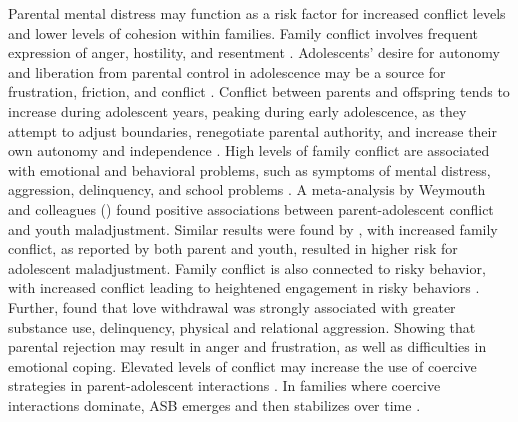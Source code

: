 \documentclass{sn-jnl}                  %
\begin{document}
Parental mental distress may function as a risk factor for increased conflict levels and lower levels of cohesion within families. Family conflict involves frequent expression of anger, hostility, and resentment \citep{lobraico:2020}.  Adolescents' desire for autonomy and liberation from parental control in adolescence may be a source for frustration, friction, and conflict \citep{buehler:2006, saxbe:2014}. Conflict between parents and offspring tends to increase during adolescent years, peaking during early adolescence, as they attempt to adjust boundaries, renegotiate parental authority, and increase their own autonomy and independence \citep{weymouth:2016}. High levels of family conflict are associated with emotional and behavioral problems, such as symptoms of mental distress, aggression, delinquency, and school problems \citep{fosco:2020, sun:2021, xu:2017}. A meta-analysis by Weymouth and colleagues (\citeyear{weymouth:2016}) found positive associations between parent-adolescent conflict and youth maladjustment. Similar results were found by \citet{xu:2017}, with increased family conflict, as reported by both parent and youth, resulted in higher risk for adolescent maladjustment. Family conflict is also connected to risky behavior, with increased conflict leading to heightened engagement in risky behaviors \citep{skinner:2016}. Further, \citet{romm:2022} found that love withdrawal was strongly associated with greater substance use, delinquency, physical and relational aggression. Showing that parental rejection may result in anger and frustration, as well as difficulties in emotional coping. Elevated levels of conflict may increase the use of coercive strategies in parent-adolescent interactions \citep{lobraico:2020}. In families where coercive interactions dominate, ASB emerges and then stabilizes over time \citep{granic:2006}.
\end{document}
